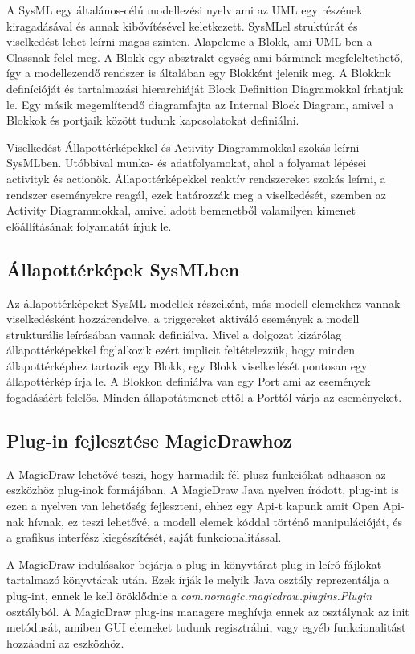 A SysML egy általános-célú modellezési nyelv ami az UML egy részének kiragadásával és annak kibővítésével keletkezett. SysMLel struktúrát és viselkedést lehet leírni magas szinten. Alapeleme a Blokk, ami UML-ben a Classnak felel meg. A Blokk egy absztrakt egység ami bárminek megfeleltethető, így a modellezendő rendszer is általában egy Blokként jelenik meg. A Blokkok definícióját és tartalmazási hierarchiáját Block Definition Diagramokkal írhatjuk le. Egy másik megemlítendő diagramfajta az Internal Block Diagram, amivel a Blokkok és portjaik között tudunk kapcsolatokat definiálni.

Viselkedést Állapottérképekkel és Activity Diagrammokkal szokás leírni SysMLben. Utóbbival munka- és adatfolyamokat, ahol a folyamat lépései activityk és actionök. Állapottérképekkel reaktív rendszereket szokás leírni, a rendszer eseményekre reagál, ezek határozzák meg a viselkedését, szemben az Activity Diagrammokkal, amivel adott bemenetből valamilyen kimenet előállításának folyamatát írjuk le.

\subsection{Állapottérképek SysMLben}
Az állapottérképeket SysML modellek részeiként, más modell elemekhez vannak viselkedésként hozzárendelve, a triggereket aktiváló események a modell strukturális leírásában vannak definiálva. Mivel a dolgozat kizárólag állapottérképekkel foglalkozik ezért implicit feltételezzük, hogy minden állapottérképhez tartozik egy Blokk, egy Blokk viselkedését pontosan egy állapottérkép írja le. A Blokkon definiálva van egy Port ami az események fogadásáért felelős. Minden állapotátmenet ettől a Porttól várja az eseményeket.

\subsection{Plug-in fejlesztése MagicDrawhoz}
A MagicDraw lehetővé teszi, hogy harmadik fél plusz funkciókat adhasson az eszközhöz plug-inok formájában. A MagicDraw Java nyelven íródott, plug-int is ezen a nyelven van lehetőség fejleszteni, ehhez egy Api-t kapunk amit Open Api-nak \cite{OpenApi} hívnak, ez teszi lehetővé, a modell elemek kóddal történő manipulációját, és a grafikus interfész kiegészítését, saját funkcionalitással.

A MagicDraw indulásakor bejárja a plug-in könyvtárat plug-in leíró fájlokat tartalmazó könyvtárak után. Ezek írják le melyik Java osztály reprezentálja a plug-int, ennek le kell öröklődnie a \emph{com.nomagic.magicdraw.plugins.Plugin} osztályból. A MagicDraw plug-ins managere meghívja ennek az osztálynak az init metódusát, amiben GUI elemeket tudunk regisztrálni, vagy egyéb funkcionalitást hozzáadni az eszközhöz.

